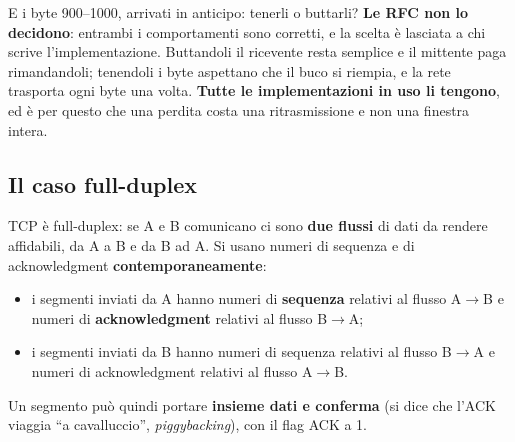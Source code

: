 E i byte 900--1000, arrivati in anticipo: tenerli o buttarli? \textbf{Le RFC non lo decidono}: entrambi i comportamenti
sono corretti, e la scelta è lasciata a chi scrive l'implementazione. Buttandoli il ricevente resta semplice e il
mittente paga rimandandoli; tenendoli i byte aspettano che il buco si riempia, e la rete trasporta ogni byte una volta.
\textbf{Tutte le implementazioni in uso li tengono}, ed è per questo che una perdita costa una ritrasmissione e non una
finestra intera.

\subsection{Il caso full-duplex}

TCP è full-duplex: se A e B comunicano ci sono \textbf{due flussi} di dati da rendere affidabili, da A a B
e da B ad A. Si usano numeri di sequenza e di acknowledgment \textbf{contemporaneamente}:

\begin{itemize}
    \item i segmenti inviati da A hanno numeri di \textbf{sequenza} relativi al flusso A$\rightarrow$B e numeri di
          \textbf{acknowledgment} relativi al flusso B$\rightarrow$A;
    \item i segmenti inviati da B hanno numeri di sequenza relativi al flusso B$\rightarrow$A e numeri di
          acknowledgment relativi al flusso A$\rightarrow$B.
\end{itemize}

Un segmento può quindi portare \textbf{insieme dati e conferma} (si dice che l'ACK viaggia ``a cavalluccio'',
\emph{piggybacking}), con il flag ACK a 1.

